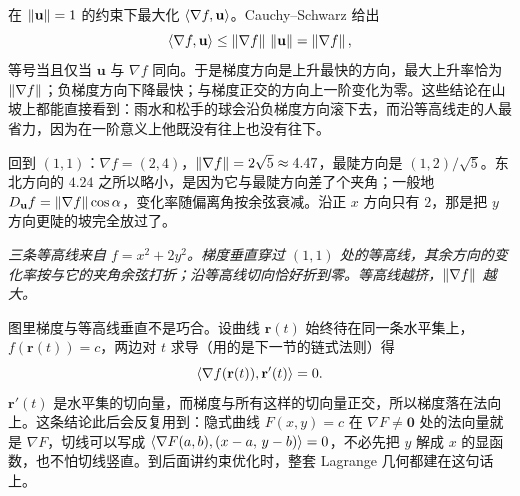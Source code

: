 在 \(\left\lVert\mathbf u\right\rVert=1\) 的约束下最大化 \(\left\langle\nabla f,\mathbf u\right\rangle\)。Cauchy--Schwarz 给出
\[
\left\langle\nabla f,\mathbf u\right\rangle\le\left\lVert\nabla f\right\rVert\,\left\lVert\mathbf u\right\rVert=\left\lVert\nabla f\right\rVert,
\]
等号当且仅当 \(\mathbf u\) 与 \(\nabla f\) 同向。于是梯度方向是上升最快的方向，最大上升率恰为 \(\left\lVert\nabla f\right\rVert\)；负梯度方向下降最快；与梯度正交的方向上一阶变化为零。这些结论在山坡上都能直接看到：雨水和松手的球会沿负梯度方向滚下去，而沿等高线走的人最省力，因为在一阶意义上他既没有往上也没有往下。

回到 \((1,1)\)：\(\nabla f=(2,4)\)，\(\left\lVert\nabla f\right\rVert=2\sqrt5\approx4.47\)，最陡方向是 \((1,2)/\sqrt5\)。东北方向的 \(4.24\) 之所以略小，是因为它与最陡方向差了个夹角；一般地 \(D_{\mathbf u}f=\left\lVert\nabla f\right\rVert\cos\alpha\)，变化率随偏离角按余弦衰减。沿正 \(x\) 方向只有 \(2\)，那是把 \(y\) 方向更陡的坡完全放过了。

\begin{center}

\emph{三条等高线来自 \(f=x^2+2y^2\)。梯度垂直穿过 \((1,1)\) 处的等高线，其余方向的变化率按与它的夹角余弦打折；沿等高线切向恰好折到零。等高线越挤，\(\left\lVert\nabla f\right\rVert\) 越大。}
\end{center}

图里梯度与等高线垂直不是巧合。设曲线 \(\mathbf r(t)\) 始终待在同一条水平集上，\(f(\mathbf r(t))=c\)，两边对 \(t\) 求导（用的是下一节的链式法则）得
\[
\left\langle\nabla f(\mathbf r(t)),\mathbf r'(t)\right\rangle=0 .
\]
\(\mathbf r'(t)\) 是水平集的切向量，而梯度与所有这样的切向量正交，所以梯度落在法向上。这条结论此后会反复用到：隐式曲线 \(F(x,y)=c\) 在 \(\nabla F\ne\mathbf 0\) 处的法向量就是 \(\nabla F\)，切线可以写成 \(\left\langle\nabla F(a,b),(x-a,\,y-b)\right\rangle=0\)，不必先把 \(y\) 解成 \(x\) 的显函数，也不怕切线竖直。到后面讲约束优化时，整套 Lagrange 几何都建在这句话上。

